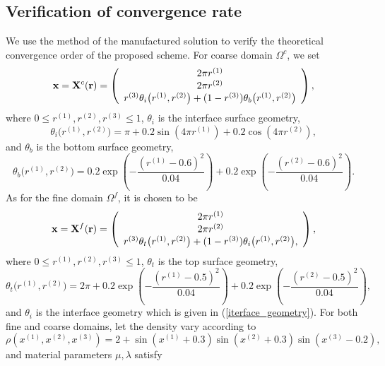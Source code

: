 \subsection{Verification of convergence rate}\label{convergence_study}
We use the method of the manufactured solution to verify the theoretical convergence order of the proposed scheme. For coarse domain $\Omega^c$, we set
\[ {\bf x} = {\bf X}^c({\bf r}) = \left(\begin{array}{c}
2\pi r^{(1)} \\
2\pi r^{(2)} \\
r^{(3)}\theta_i\big(r^{(1)},r^{(2)}\big) + (1-r^{(3)})\theta_b\big(r^{(1)},r^{(2)}\big) \end{array}\right), \]
where $0\leq r^{(1)}, r^{(2)}, r^{(3)}\leq 1$, $\theta_i$ is the interface surface geometry,
\begin{equation}\label{iterface_geometry}
\theta_i\big(r^{(1)},r^{(2)}\big) = \pi+0.2\sin(4\pi r^{(1)})+0.2\cos(4\pi r^{(2)}),
\end{equation}
and 
$\theta_b$ is the bottom surface geometry,
\begin{equation*}\label{bottom_geometry}
\theta_b\big(r^{(1)},r^{(2)}\big) = 0.2\exp\left(-\frac{(r^{(1)}-0.6)^2}{0.04}\right)+0.2\exp\left(-\frac{(r^{(2)}-0.6)^2}{0.04}\right).
\end{equation*}
As for the fine domain $\Omega^f$, it is chosen to be
\[ {\bf x} = {\bf X}^f({\bf r}) = \left(\begin{array}{c}
2\pi r^{(1)}\\
2\pi r^{(2)}\\
r^{(3)}\theta_t\big(r^{(1)},r^{(2)}\big) + (1-r^{(3)})\theta_i\big(r^{(1)},r^{(2)}\big), \end{array}\right), \]
where $0\leq r^{(1)}, r^{(2)}, r^{(3)}\leq 1$, $\theta_t$ is the top surface geometry,
\begin{equation*}\label{top_geometry}
\theta_t\big(r^{(1)},r^{(2)}\big) = 2\pi+0.2\exp\left(-\frac{(r^{(1)}-0.5)^2}{0.04}\right)+0.2\exp\left(-\frac{(r^{(2)}-0.5)^2}{0.04}\right),
\end{equation*}
and $\theta_i$ is the interface geometry which is given in (\ref{iterface_geometry}). For both fine and coarse domains, let the density vary according to
\begin{equation*}\label{density_function}
\rho(x^{(1)},x^{(2)},x^{(3)}) = 2 + \sin(x^{(1)}+0.3)\sin(x^{(2)}+0.3)\sin(x^{(3)}-0.2),
\end{equation*}
and material parameters $\mu, \lambda$ satisfy
